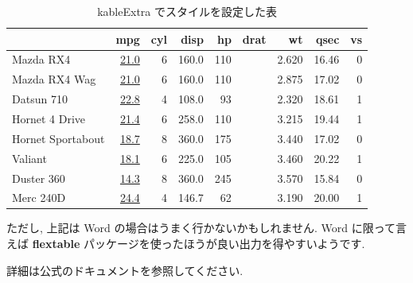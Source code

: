 \documentclass[
]{ltjsarticle}
\begin{document}
\begin{table}

\caption{\label{tab:table-example2}kableExtra でスタイルを設定した表}
\centering
\begin{tabular}[t]{l>{}rrrr>{}rrrr}
\toprule
  & mpg & cyl & disp & hp & drat & wt & qsec & vs\\
\midrule
Mazda RX4 & \href{https://haozhu233.github.io/kableExtra/}{\textcolor[HTML]{34B679}{21.0}} & 6 & 160.0 & 110 & \cellcolor[HTML]{43BF71}{\textcolor{white}{3.90}} & 2.620 & 16.46 & 0\\
Mazda RX4 Wag & \href{https://haozhu233.github.io/kableExtra/}{\textcolor[HTML]{34B679}{21.0}} & 6 & 160.0 & 110 & \cellcolor[HTML]{43BF71}{\textcolor{white}{3.90}} & 2.875 & 17.02 & 0\\
Datsun 710 & \href{https://haozhu233.github.io/kableExtra/}{\textcolor[HTML]{95D840}{22.8}} & 4 & 108.0 & 93 & \cellcolor[HTML]{37B878}{\textcolor{white}{3.85}} & 2.320 & 18.61 & 1\\
Hornet 4 Drive & \href{https://haozhu233.github.io/kableExtra/}{\textcolor[HTML]{44BF70}{21.4}} & 6 & 258.0 & 110 & \cellcolor[HTML]{414387}{\textcolor{white}{3.08}} & 3.215 & 19.44 & 1\\
Hornet Sportabout & \href{https://haozhu233.github.io/kableExtra/}{\textcolor[HTML]{26818E}{18.7}} & 8 & 360.0 & 175 & \cellcolor[HTML]{3C4F8A}{\textcolor{white}{3.15}} & 3.440 & 17.02 & 0\\
\addlinespace
Valiant & \href{https://haozhu233.github.io/kableExtra/}{\textcolor[HTML]{2C728E}{18.1}} & 6 & 225.0 & 105 & \cellcolor[HTML]{440154}{\textcolor{white}{2.76}} & 3.460 & 20.22 & 1\\
Duster 360 & \href{https://haozhu233.github.io/kableExtra/}{\textcolor[HTML]{440154}{14.3}} & 8 & 360.0 & 245 & \cellcolor[HTML]{375A8C}{\textcolor{white}{3.21}} & 3.570 & 15.84 & 0\\
Merc 240D & \href{https://haozhu233.github.io/kableExtra/}{\textcolor[HTML]{FDE725}{24.4}} & 4 & 146.7 & 62 & \cellcolor[HTML]{1FA187}{\textcolor{white}{3.69}} & 3.190 & 20.00 & 1\\
\bottomrule
\end{tabular}
\end{table}

ただし, 上記は Word の場合はうまく行かないかもしれません. Word に限って言えば \textbf{flextable} パッケージを使ったほうが良い出力を得やすいようです.

詳細は公式のドキュメントを参照してください.
\end{document}
